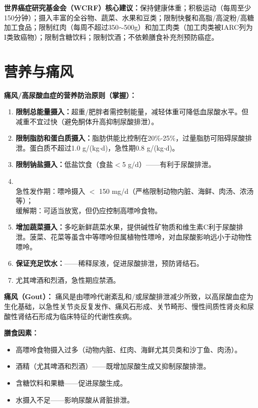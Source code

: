 \begin{tipbox}
\textbf{世界癌症研究基金会（WCRF）核心建议：}保持健康体重；积极运动（每周至少150分钟）；摄入丰富的全谷物、蔬菜、水果和豆类；限制快餐和高脂/高淀粉/高糖加工食品；限制红肉（每周不超过350$\sim$500g）和加工肉类（加工肉类被IARC列为I类致癌物）；限制含糖饮料；限制饮酒；不依赖膳食补充剂预防癌症。
\end{tipbox}

\section{营养与痛风}

\begin{keybox}
\textbf{痛风/高尿酸血症的营养防治原则（掌握）：}

\begin{enumerate}[leftmargin=*]
    \item \textbf{限制总能量摄入：}超重/肥胖者需控制能量，减轻体重可降低血尿酸水平。但减重不宜过快（避免酮体升高抑制尿酸排泄）。
    \item \textbf{限制脂肪和蛋白质摄入：}脂肪供能比控制在20\%-25\%，过量脂肪可阻碍尿酸排泄。蛋白质不超过1.0 g/(kg$\cdot$d)，急性期0.8 g/(kg$\cdot$d)。
    \item \textbf{限制钠盐摄入：}低盐饮食（食盐$<$5 g/d）——有利于尿酸排泄。
    \item \textbf{}\\ 急性发作期：嘌呤摄入 $<$ 150 mg/d（严格限制动物内脏、海鲜、肉汤、浓汤等）；\\ 缓解期：可适当放宽，但仍应控制高嘌呤食物。
    \item \textbf{增加蔬菜摄入：}多吃新鲜蔬菜水果，提供碱性矿物质和维生素C利于尿酸排泄。菠菜、花菜等虽含中等嘌呤但属植物性嘌呤，对血尿酸影响远小于动物性嘌呤。
    \item \textbf{保证充足饮水：}——稀释尿液，促进尿酸排泄，预防肾结石。
    \item \textbf{}尤其啤酒和烈酒，急性期应禁酒。
\end{enumerate}
\end{keybox}

\begin{defbox}
\textbf{痛风（Gout）：}
痛风是由嘌呤代谢紊乱和/或尿酸排泄减少所致，以高尿酸血症为生化基础，以急性关节炎反复发作、痛风石形成、关节畸形、慢性间质性肾炎和尿酸性肾结石形成为临床特征的代谢性疾病。

\textbf{膳食因素：}
\begin{itemize}[leftmargin=*]
    \item 高嘌呤食物摄入过多（动物内脏、红肉、海鲜尤其贝类和沙丁鱼、肉汤）。
    \item 酒精（尤其啤酒和烈酒）——既增加尿酸生成又抑制尿酸排泄。
    \item 含糖饮料和果糖——促进尿酸生成。
    \item 水摄入不足——影响尿酸从肾脏排泄。
\end{itemize}
\end{defbox}

